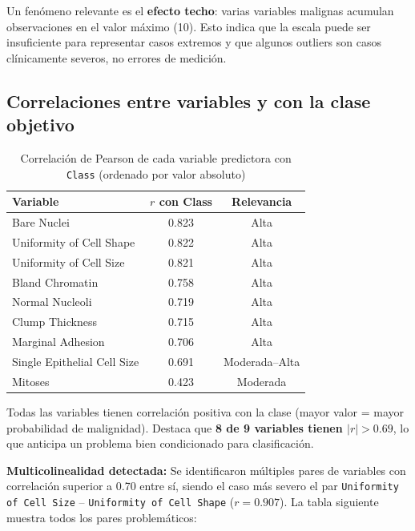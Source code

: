 \documentclass[11pt,a4paper]{article}
\begin{document}
Un fenómeno relevante es el \textbf{efecto techo}: varias variables malignas acumulan observaciones en el valor máximo (10). Esto indica que la escala puede ser insuficiente para representar casos extremos y que algunos outliers son casos clínicamente severos, no errores de medición.

\subsection{Correlaciones entre variables y con la clase objetivo}

\begin{table}[H]
\centering
\caption{Correlación de Pearson de cada variable predictora con \texttt{Class} (ordenado por valor absoluto)}
\begin{tabular}{lcc}
\toprule
\textbf{Variable} & \textbf{$r$ con Class} & \textbf{Relevancia} \\
\midrule
\rowcolor{malignored!15}
Bare Nuclei & 0.823 & Alta \\
\rowcolor{malignored!15}
Uniformity of Cell Shape & 0.822 & Alta \\
\rowcolor{malignored!15}
Uniformity of Cell Size & 0.821 & Alta \\
Bland Chromatin & 0.758 & Alta \\
Normal Nucleoli & 0.719 & Alta \\
Clump Thickness & 0.715 & Alta \\
Marginal Adhesion & 0.706 & Alta \\
Single Epithelial Cell Size & 0.691 & Moderada--Alta \\
Mitoses & 0.423 & Moderada \\
\bottomrule
\end{tabular}
\end{table}

Todas las variables tienen correlación positiva con la clase (mayor valor = mayor probabilidad de malignidad). Destaca que \textbf{8 de 9 variables tienen $|r| > 0.69$}, lo que anticipa un problema bien condicionado para clasificación.

\textbf{Multicolinealidad detectada:} Se identificaron múltiples pares de variables con correlación superior a 0.70 entre sí, siendo el caso más severo el par \texttt{Uniformity of Cell Size} -- \texttt{Uniformity of Cell Shape} ($r = 0.907$). La tabla siguiente muestra todos los pares problemáticos:
\end{document}
